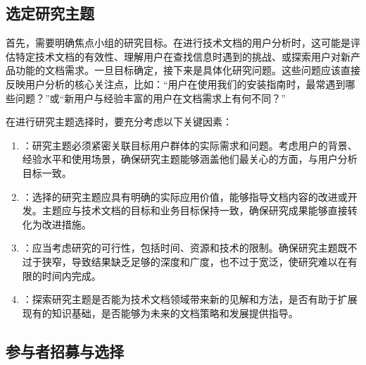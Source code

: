 \documentclass[letterpaper,10pt,english]{sphinxmanual}
\begin{document}
\subsection{选定研究主题}
\label{\detokenize{user-research/focus-group:id11}}
\sphinxAtStartPar
首先，需要明确焦点小组的研究目标。在进行技术文档的用户分析时，这可能是评估特定技术文档的有效性、理解用户在查找信息时遇到的挑战、或探索用户对新产品功能的文档需求。一旦目标确定，接下来是具体化研究问题。这些问题应该直接反映用户分析的核心关注点，比如：“用户在使用我们的安装指南时，最常遇到哪些问题？”或“新用户与经验丰富的用户在文档需求上有何不同？”

\sphinxAtStartPar
在进行研究主题选择时，要充分考虑以下关键因素：
\begin{enumerate}
%
\item {} 
\sphinxAtStartPar
{}：研究主题必须紧密关联目标用户群体的实际需求和问题。考虑用户的背景、经验水平和使用场景，确保研究主题能够涵盖他们最关心的方面，与用户分析目标一致。

\item {} 
\sphinxAtStartPar
{}：选择的研究主题应具有明确的实际应用价值，能够指导文档内容的改进或开发。主题应与技术文档的目标和业务目标保持一致，确保研究成果能够直接转化为改进措施。

\item {} 
\sphinxAtStartPar
{}：应当考虑研究的可行性，包括时间、资源和技术的限制。确保研究主题既不过于狭窄，导致结果缺乏足够的深度和广度，也不过于宽泛，使研究难以在有限的时间内完成。

\item {} 
\sphinxAtStartPar
{}：探索研究主题是否能为技术文档领域带来新的见解和方法，是否有助于扩展现有的知识基础，是否能够为未来的文档策略和发展提供指导。

\end{enumerate}


\subsection{参与者招募与选择}
\label{\detokenize{user-research/focus-group:id12}}
\end{document}
